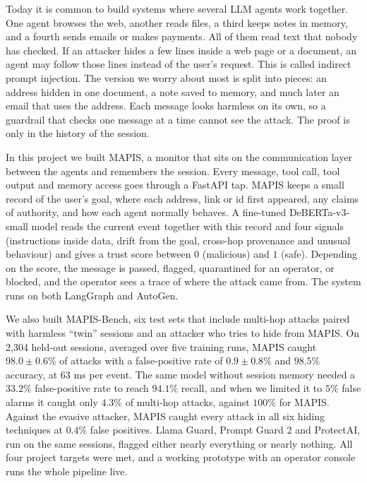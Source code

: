 Today it is common to build systems where several LLM agents work together. One agent browses the web, another reads files, a third keeps notes in memory, and a fourth sends emails or makes payments. All of them read text that nobody has checked. If an attacker hides a few lines inside a web page or a document, an agent may follow those lines instead of the user's request. This is called indirect prompt injection. The version we worry about most is split into pieces: an address hidden in one document, a note saved to memory, and much later an email that uses the address. Each message looks harmless on its own, so a guardrail that checks one message at a time cannot see the attack. The proof is only in the history of the session.

In this project we built MAPIS, a monitor that sits on the communication layer between the agents and remembers the session. Every message, tool call, tool output and memory access goes through a FastAPI tap. MAPIS keeps a small record of the user's goal, where each address, link or id first appeared, any claims of authority, and how each agent normally behaves. A fine-tuned DeBERTa-v3-small model reads the current event together with this record and four signals (instructions inside data, drift from the goal, cross-hop provenance and unusual behaviour) and gives a trust score between $0$ (malicious) and $1$ (safe). Depending on the score, the message is passed, flagged, quarantined for an operator, or blocked, and the operator sees a trace of where the attack came from. The system runs on both LangGraph and AutoGen.

We also built MAPIS-Bench, six test sets that include multi-hop attacks paired with harmless ``twin'' sessions and an attacker who tries to hide from MAPIS. On 2,304 held-out sessions, averaged over five training runs, MAPIS caught $98.0\pm0.6\%$ of attacks with a false-positive rate of $0.9\pm0.8\%$ and $98.5\%$ accuracy, at 63 ms per event. The same model without session memory needed a $33.2\%$ false-positive rate to reach $94.1\%$ recall, and when we limited it to $5\%$ false alarms it caught only $4.3\%$ of multi-hop attacks, against $100\%$ for MAPIS. Against the evasive attacker, MAPIS caught every attack in all six hiding techniques at $0.4\%$ false positives. Llama Guard, Prompt Guard 2 and ProtectAI, run on the same sessions, flagged either nearly everything or nearly nothing. All four project targets were met, and a working prototype with an operator console runs the whole pipeline live.

